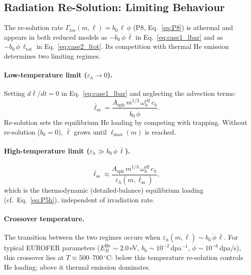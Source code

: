 \documentclass[pdflatex,sn-basic]{sn-jnl} %
\begin{document}
\subsection{Radiation Re-Solution: Limiting Behaviour}
\label{sec:resolution_limits}

The re-solution rate $\Gamma_{\mathrm{res}}(m,\ell) = b_0\,\ell\,\dot{\phi}$
(P8, Eq.~\ref{eq:P8}) is athermal and appears in both reduced models as
$-b_0\,\dot{\phi}\,\bar{\ell}$ in Eq.~\eqref{eq:case1_lbar} and as
$-b_0\,\dot{\phi}\,\ell_{\mathrm{tot}}$ in Eq.~\eqref{eq:case2_ltot}.
Its competition with thermal He emission determines two limiting regimes.

\paragraph{Low-temperature limit ($\varepsilon_h \to 0$).}
Setting $d\bar{\ell}/dt = 0$ in Eq.~\eqref{eq:case1_lbar} and
neglecting the advection terms:
\begin{equation}\label{eq:lbar_ss_lowT}
    \bar{\ell}_{\mathrm{ss}}
    = \frac{A_{\mathrm{sph}}\,m^{1/3}\,\omega_h^{\mathrm{eff}}\,c_h}
           {b_0\,\dot{\phi}}.
\end{equation}
Re-solution sets the equilibrium He loading by competing with trapping.
Without re-solution ($b_0 = 0$), $\bar{\ell}$ grows until
$\ell_{\max}(m)$ is reached.

\paragraph{High-temperature limit
($\varepsilon_h \gg b_0\,\dot{\phi}\,\bar{\ell}$).}
\begin{equation}\label{eq:lbar_ss_highT}
    \bar{\ell}_{\mathrm{ss}}
    \approx \frac{A_{\mathrm{sph}}\,m^{1/3}\,\omega_h^{\mathrm{eff}}\,c_h}
                 {\varepsilon_h(m,\bar{\ell}_{\mathrm{ss}})},
\end{equation}
which is the thermodynamic (detailed-balance) equilibrium loading
(cf.\ Eq.~\ref{eq:P5h}), independent of irradiation rate.

\paragraph{Crossover temperature.}
The transition between the two regimes occurs when
$\varepsilon_h(m,\bar{\ell}) \sim b_0\,\dot{\phi}\,\bar{\ell}$. For
typical EUROFER parameters ($E_B^{\mathrm{He}} \sim 2.0$\,eV,
$b_0 \sim 10^{-2}$\,dpa$^{-1}$, $\dot{\phi} \sim 10^{-6}$\,dpa/s),
this crossover lies at $T \approx 500$--$700\,^\circ$C: below this
temperature re-solution controls He loading; above it thermal emission
dominates.
\end{document}
